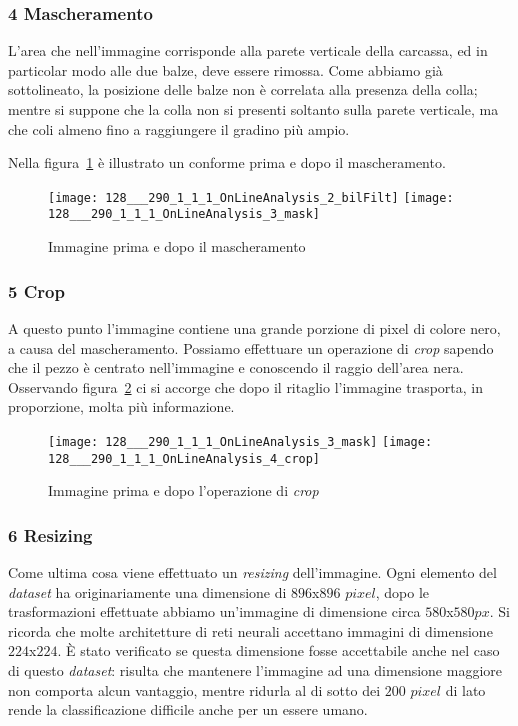 \subsubsection{4 Mascheramento}
L'area che nell'immagine corrisponde alla parete verticale della carcassa, ed in particolar modo alle due balze, deve essere rimossa.
Come abbiamo già sottolineato, la posizione delle balze non è correlata alla presenza della colla; mentre si suppone che la colla non si presenti soltanto sulla parete verticale, ma che coli almeno fino a raggiungere il gradino più ampio.

Nella figura~\ref{fig:mask} è illustrato un conforme prima e dopo il mascheramento.

\begin{figure}[ht] %
  \begin{center}
    \texttt{[image: 128\_\_\_290\_1\_1\_1\_OnLineAnalysis\_2\_bilFilt]}
    \texttt{[image: 128\_\_\_290\_1\_1\_1\_OnLineAnalysis\_3\_mask]}
    \caption{Immagine prima e dopo il mascheramento}
    \label{fig:mask}
  \end{center}
\end{figure}

\subsubsection{5 Crop}
A questo punto l'immagine contiene una grande porzione di pixel di colore nero, a causa del mascheramento.
Possiamo effettuare un operazione di \textit{crop} sapendo che il pezzo è centrato nell'immagine e conoscendo il raggio dell'area nera.
Osservando figura~\ref{fig:crop} ci si accorge che dopo il ritaglio l'immagine trasporta, in proporzione, molta più informazione.

\begin{figure}[ht] %
  \begin{center}
    \texttt{[image: 128\_\_\_290\_1\_1\_1\_OnLineAnalysis\_3\_mask]}
    \texttt{[image: 128\_\_\_290\_1\_1\_1\_OnLineAnalysis\_4\_crop]}
    \caption{Immagine prima e dopo l'operazione di \textit{crop}}
    \label{fig:crop}
  \end{center}
\end{figure}

\subsubsection{6 Resizing}
Come ultima cosa viene effettuato un \textit{resizing} dell'immagine.
Ogni elemento del \textit{dataset} ha originariamente una dimensione di $896$x$896$ $pixel$, dopo le trasformazioni effettuate abbiamo un'immagine di dimensione circa $580$x$580px$.
Si ricorda che molte architetture di reti neurali accettano immagini di dimensione $224$x$224$.
È stato verificato se questa dimensione fosse accettabile anche nel caso di questo \textit{dataset}: risulta che mantenere l'immagine ad una dimensione maggiore non comporta alcun vantaggio, mentre ridurla al di sotto dei $200$ $pixel$ di lato rende la classificazione difficile anche per un essere umano.

